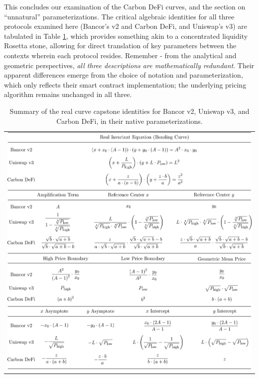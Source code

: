 \documentclass{article}
\begin{document}
This concludes our examination of the Carbon DeFi curves, and the section on “unnatural” parameterizations. The critical algebraic identities for all three protocols examined here (Bancor's v2 and Carbon DeFi, and Uniswap's v3) are tabulated in Table \ref{tab1}, which provides something akin to a concentrated liquidity Rosetta stone, allowing for direct translation of key parameters between the contexts wherein each protocol resides. Remember - from the analytical and geometric perspectives, \textit{all three descriptions are mathematically redundant}. Their apparent differences emerge from the choice of notation and parameterization, which only reflects their smart contract implementation; the underlying pricing algorithm remains unchanged in all three. 

\begin{table}[ht]
    \centering
    \begin{tabular}{c}
    \includegraphics[width=\linewidth]{tab1.png}
    \end{tabular}
    \captionsetup{
        justification=raggedright,
        singlelinecheck=false,
        font=small,
        labelfont=bf,
        labelsep=quad,
        format=plain
    }
    \caption{Summary of the real curve capstone identities for Bancor v2, Uniswap v3, and Carbon DeFi, in their native parameterizations.}
    \label{tab1}
\end{table}
\end{document}
